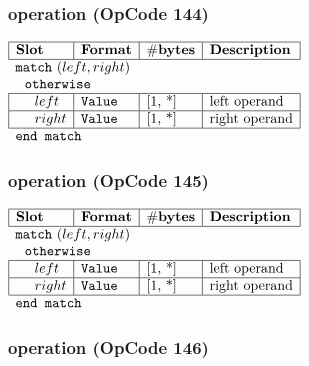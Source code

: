 \subsubsection{ operation (OpCode 144)}

\noindent
\(\begin{array}{| l | l | l | l |}
    \hline
    \bf{Slot} & \bf{Format} & \bf{\#bytes} & \bf{Description} \\
    \hline
        \multicolumn{4}{l}{\lst{match}~(left, right)} \\
         
    \multicolumn{4}{l}{~~\lst{otherwise} } \\
    \hline
            ~~~~ left & \lst{Value} & \text{[1, *]} & \text{left operand} \\
    \hline
          ~~~~ right & \lst{Value} & \text{[1, *]} & \text{right operand} \\
    \hline
          \multicolumn{4}{l}{\lst{end match}} \\
\end{array}\)
       

\subsubsection{ operation (OpCode 145)}

\noindent
\(\begin{array}{| l | l | l | l |}
    \hline
    \bf{Slot} & \bf{Format} & \bf{\#bytes} & \bf{Description} \\
    \hline
        \multicolumn{4}{l}{\lst{match}~(left, right)} \\
         
    \multicolumn{4}{l}{~~\lst{otherwise} } \\
    \hline
            ~~~~ left & \lst{Value} & \text{[1, *]} & \text{left operand} \\
    \hline
          ~~~~ right & \lst{Value} & \text{[1, *]} & \text{right operand} \\
    \hline
          \multicolumn{4}{l}{\lst{end match}} \\
\end{array}\)
       

\subsubsection{ operation (OpCode 146)}

